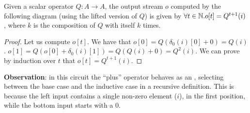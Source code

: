 \begin{theorem}
Given a scalar operator $Q: A \rightarrow A$, the output stream $o$ computed by the
following diagram (using the lifted version of $Q$) is given by $\forall t \in \mathbb{N} . o[t] = Q^{t+1}(i)$, where $k$ is the composition
of $Q$ with itself $k$ times.

\begin{center}
\end{center}
\end{theorem}
\begin{proof}
  Let us compute $o[t]$.  We have that $o[0] =
  Q(\delta_0(i)[0] + 0) = Q(i)$.  $o[1] =
  Q(o[0] + \delta_0(i)[1]) =
  Q(Q(i) + 0) = Q^2(i)$.  We can prove by induction
  over $t$ that $o[t] = Q^{t+1}(i)$.
\end{proof}

\textbf{Observation}: in this circuit the ``plus'' operator behaves as an , selecting between
the base case and the inductive case in a recursive definition.
This is because the left input contains a single non-zero
element ($i$), in the first position, while the bottom input starts with a 0.


